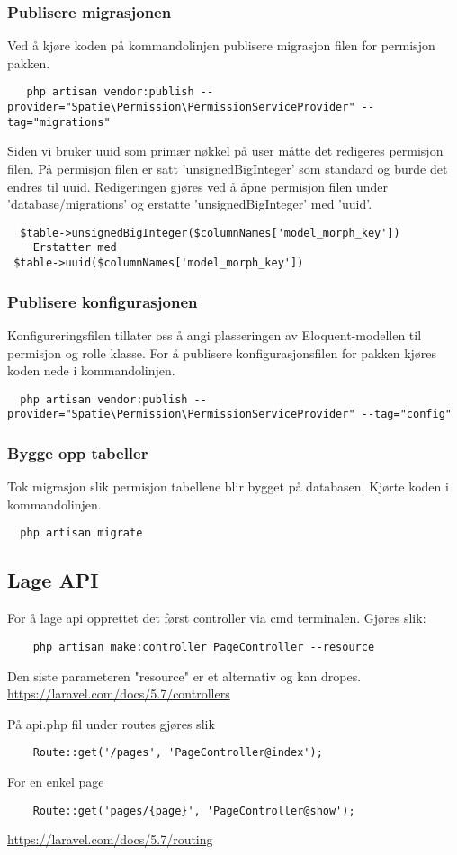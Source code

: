 \subsubsection{Publisere migrasjonen}
Ved å kjøre koden på kommandolinjen publisere migrasjon filen for permisjon pakken.
\begin{lstlisting}
   php artisan vendor:publish --provider="Spatie\Permission\PermissionServiceProvider" --tag="migrations" 
\end{lstlisting}

Siden vi bruker uuid som primær nøkkel på user måtte det redigeres permisjon filen. På permisjon filen er satt 'unsignedBigInteger' som standard og burde det  endres  til uuid. Redigeringen gjøres ved å åpne permisjon filen  under 'database/migrations' og erstatte 'unsignedBigInteger' med 'uuid'.
\begin{lstlisting}
  $table->unsignedBigInteger($columnNames['model_morph_key'])
    Erstatter med 
 $table->uuid($columnNames['model_morph_key'])
\end{lstlisting}

\subsubsection{Publisere konfigurasjonen}
Konfigureringsfilen tillater oss å angi plasseringen av Eloquent-modellen til permisjon og rolle klasse.
For å publisere konfigurasjonsfilen for pakken kjøres koden nede i kommandolinjen.

\begin{lstlisting}
  php artisan vendor:publish --provider="Spatie\Permission\PermissionServiceProvider" --tag="config"
\end{lstlisting}

\subsubsection{Bygge opp tabeller}
Tok migrasjon slik permisjon tabellene blir bygget på databasen.
Kjørte koden i kommandolinjen.
\begin{lstlisting}
  php artisan migrate
\end{lstlisting}

\subsection{Lage API}
For å lage api opprettet det først controller via cmd terminalen.
Gjøres slik:
\begin{lstlisting}
    php artisan make:controller PageController --resource
\end{lstlisting}
Den siste parameteren "resource" er et alternativ og kan dropes.
\url{https://laravel.com/docs/5.7/controllers}

På api.php fil under routes gjøres slik
\begin{lstlisting}
    Route::get('/pages', 'PageController@index');
\end{lstlisting} 
For en enkel page
\begin{lstlisting}
    Route::get('pages/{page}', 'PageController@show');
\end{lstlisting}
\url{https://laravel.com/docs/5.7/routing}




\clearpage